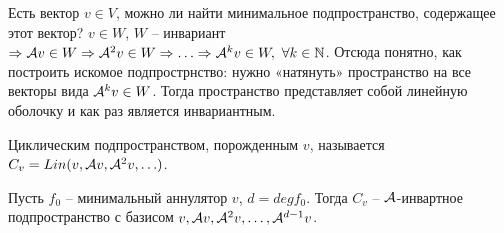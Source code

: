 \documentclass[main]{subfiles}
\begin{document}
Есть вектор $v \in V$, можно ли найти минимальное подпространство, содержащее этот вектор? $v\in W$, $W$ -- инвариант $\Rightarrow \mathcal{A} v \in W \Rightarrow {\mathcal{A}}^2 v \in W \Rightarrow \ldots \Rightarrow  {\mathcal{A}}^k v \in W, \ \forall k \in \mathbb{N}$.
Отсюда понятно, как построить искомое подпрострнство: нужно «натянуть» пространство на все векторы вида ${\mathcal{A}}^k v \in W$. Тогда пространство представляет собой линейную оболочку и как раз является инвариантным.

\begin{definition} 
    Циклическим подпространством, порожденным $v$, называется $C_v = Lin(v, \mathcal{A} v, {\mathcal{A}}^2 v, \ldots)$.
\end{definition}

\begin{proposition}
    Пусть $f_0$ -- минимальный аннулятор $v$, $d = deg f_0$. Тогда $C_v$ -- $\mathcal{A}$-инвартное подпространство с базисом
    $v, \mathcal{A} v, {\mathcal{A}}^2 v, \ldots, {\mathcal{A}}^{d-1} v$.
\end{proposition}
\end{document}
